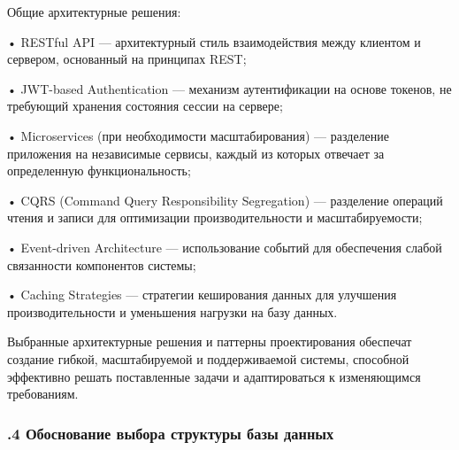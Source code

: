 {  \par \redline Общие архитектурные решения:

  \par \redline • RESTful API — архитектурный стиль взаимодействия между клиентом и сервером, основанный на принципах REST;
  \par \redline • JWT-based Authentication — механизм аутентификации на основе токенов, не требующий хранения состояния сессии на сервере;
  \par \redline • Microservices (при необходимости масштабирования) — разделение приложения на независимые сервисы, каждый из которых отвечает за определенную функциональность;
  \par \redline • CQRS (Command Query Responsibility Segregation) — разделение операций чтения и записи для оптимизации производительности и масштабируемости;
  \par \redline • Event-driven Architecture — использование событий для обеспечения слабой связанности компонентов системы;
  \par \redline • Caching Strategies — стратегии кеширования данных для улучшения производительности и уменьшения нагрузки на базу данных.

  \par \redline Выбранные архитектурные решения и паттерны проектирования обеспечат создание гибкой, масштабируемой и поддерживаемой системы, способной эффективно решать поставленные задачи и адаптироваться к изменяющимся требованиям.

  \par
}

\subtitlespace

\subsubsection*{ 
  \gostTitleFont
  .4 Обоснование выбора структуры базы данных
} 

\subtitlespace

